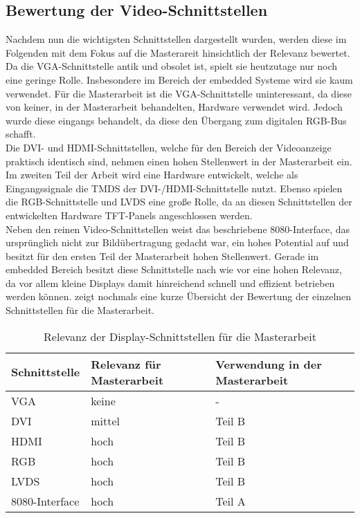 \subsection{Bewertung der Video-Schnittstellen}
\label{cha:bewertung_video}
Nachdem nun die wichtigsten Schnittstellen dargestellt wurden, werden diese im Folgenden mit dem Fokus auf die Masterareit hinsichtlich der Relevanz bewertet.
Da die VGA-Schnittstelle antik und obsolet ist, spielt sie heutzutage nur noch eine geringe Rolle. Insbesondere im Bereich der embedded Systeme wird sie kaum verwendet. Für die Masterarbeit ist die VGA-Schnittstelle uninteressant, da diese von keiner, in der Masterarbeit behandelten, Hardware verwendet wird. Jedoch wurde diese eingangs behandelt, da diese den Übergang zum digitalen RGB-Bus schafft.\\
Die DVI- und HDMI-Schnittstellen, welche für den Bereich der Videoanzeige praktisch identisch sind, nehmen einen hohen Stellenwert in der Masterarbeit ein. Im zweiten Teil der Arbeit wird eine Hardware entwickelt, welche als Eingangssignale die TMDS der DVI-/HDMI-Schnittstelle nutzt. 
Ebenso spielen die RGB-Schnittstelle und LVDS eine große Rolle, da an diesen Schnittstellen der entwickelten Hardware TFT-Panels angeschlossen werden. \\
Neben den reinen Video-Schnittstellen weist das beschriebene 8080-Interface, das ursprünglich nicht zur Bildübertragung gedacht war, ein hohes Potential auf und besitzt für den ersten Teil der Masterarbeit hohen Stellenwert. Gerade im embedded Bereich besitzt diese Schnittstelle nach wie vor eine hohen Relevanz, da vor allem kleine Displays damit hinreichend schnell und effizient betrieben werden können.  zeigt nochmals eine kurze Übersicht der Bewertung der einzelnen Schnittstellen für die Masterarbeit.

\begin{table}[h]
\begin{tabular}{|p{3cm}|p{5cm}|p{4.5cm}|}\hline
\rowcolor{TableBackgroundColor}
   \textbf{Schnittstelle} 	& \textbf{Relevanz für Masterarbeit} 	& \textbf{Verwendung in der Masterarbeit}	\\ \hline
   VGA 						& keine  								& - 	 									\\ \hline
   DVI 						& mittel 								& Teil B 									\\ \hline
   HDMI						& hoch 									& Teil B 									\\ \hline
   RGB 						& hoch 									& Teil B 									\\ \hline
   LVDS 					& hoch									& Teil B 									\\ \hline
   8080-Interface 			& hoch 									& Teil A 									\\ \hline
\end{tabular}
\caption{Relevanz der Display-Schnittstellen für die Masterarbeit}
\label{tab:interface_vergleich}
\end{table}

